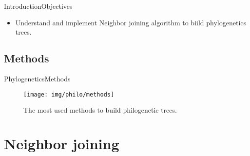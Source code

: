 \documentclass[10pt]{beamer}
\newcommand{\1}{
	\setbeamertemplate{background}{
		\texttt{[image: img/1]}
		\tikz[overlay] \fill[fill opacity=0.75,fill=white] (0,0) rectangle (-\paperwidth,\paperheight);
	}
}
\begin{document}
\begin{frame}{Introduction}{Objectives}
\begin{itemize} 
    \item<1-> Understand and implement Neighbor joining algorithm to biild phylogenetics trees.
  \end{itemize}
\end{frame}


\subsection{Methods}

\begin{frame}{Phylogenetics}{Methods}
	\begin{figure}
		\texttt{[image: img/philo/methods]}
		\caption{The most used methods to build philogenetic trees.}			
	\end{figure}
\end{frame}

\section{Neighbor joining}
\end{document}

